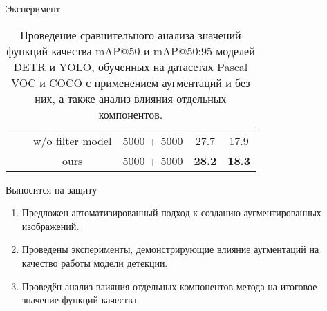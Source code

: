 \documentclass{beamer}
\begin{document}
\begin{frame}{Эксперимент}
\begin{table}[p]
\begin{tabular}{cccc|cc}
        &                              & w/o filter model             & 5000 + 5000 & 27.7 & 17.9 \\
        &                              & ours                          & 5000 + 5000 & \textbf{28.2} & \textbf{18.3} \\
\bottomrule
\end{tabular}
\caption{Проведение сравнительного анализа значений функций качества mAP@50 и mAP@50:95 моделей DETR и YOLO, обученных на датасетах Pascal VOC и COCO с применением аугментаций и без них, а также анализ влияния отдельных компонентов.}
\label{tab:augmented-metrics}
\end{table}


\end{frame}
\begin{frame}{Выносится на защиту}

{\begin{enumerate}
\Large
    \item Предложен автоматизированный подход к созданию аугментированных изображений.
    \item Проведены эксперименты, демонстрирующие влияние аугментаций на качество работы модели детекции.
    \item Проведён анализ влияния отдельных компонентов метода на итоговое значение функций качества.
\end{enumerate}}


\end{frame}
\end{document}
